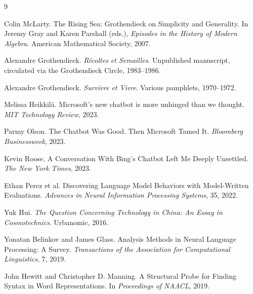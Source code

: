 
\begin{thebibliography}{9}

Colin McLarty.
\newblock The Rising Sea: Grothendieck on Simplicity and Generality.
\newblock In Jeremy Gray and Karen Parshall (eds.), \emph{Episodes in the History of Modern Algebra}. American Mathematical Society, 2007.

Alexandre Grothendieck.
\newblock \emph{R\'ecoltes et Semailles}.
\newblock Unpublished manuscript, circulated via the Grothendieck Circle, 1983--1986.

Alexandre Grothendieck.
\newblock \emph{Survivre et Vivre}.
\newblock Various pamphlets, 1970--1972.

Melissa Heikkil\"a.
\newblock Microsoft's new chatbot is more unhinged than we thought.
\newblock \emph{MIT Technology Review}, 2023.

Parmy Olson.
\newblock The Chatbot Was Good. Then Microsoft Tamed It.
\newblock \emph{Bloomberg Businessweek}, 2023.

Kevin Roose.
\newblock A Conversation With Bing's Chatbot Left Me Deeply Unsettled.
\newblock \emph{The New York Times}, 2023.

Ethan Perez et al.
\newblock Discovering Language Model Behaviors with Model-Written Evaluations.
\newblock \emph{Advances in Neural Information Processing Systems}, 35, 2022.

Yuk Hui.
\newblock \emph{The Question Concerning Technology in China: An Essay in Cosmotechnics}.
\newblock Urbanomic, 2016.

Yonatan Belinkov and James Glass.
\newblock Analysis Methods in Neural Language Processing: A Survey.
\newblock \emph{Transactions of the Association for Computational Linguistics}, 7, 2019.

John Hewitt and Christopher D. Manning.
\newblock A Structural Probe for Finding Syntax in Word Representations.
\newblock In \emph{Proceedings of NAACL}, 2019.

\end{thebibliography}
